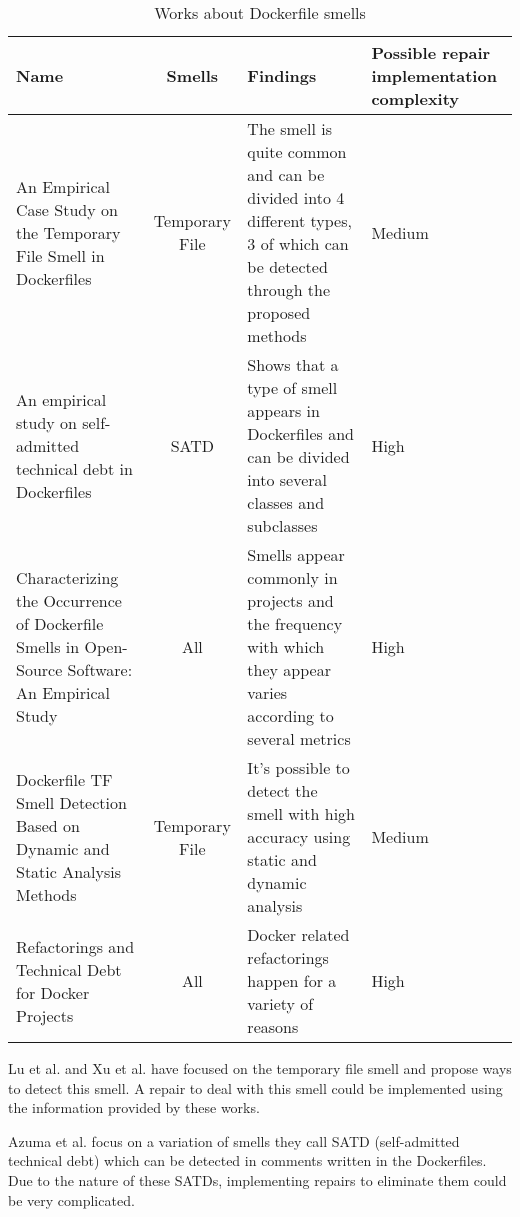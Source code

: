 \begin{table}[H]
    \centering
    \begin{tabular}{|p{}|c|p{}|p{}|}
        \hline \textbf{Name} & \textbf{Smells} & \textbf{Findings} & \textbf{Possible repair implementation complexity} \\
        \hline An Empirical Case Study on the Temporary File Smell in Dockerfiles \cite{luEmpiricalCaseStudy2019} & Temporary File & The smell is quite common and can be divided into 4 different types, 3 of which can be detected through the proposed methods & Medium \\
        \hline An empirical study on self-admitted technical debt in Dockerfiles \cite{azumaEmpiricalStudySelfadmitted2022} & SATD & Shows that a type of smell appears in Dockerfiles and can be divided into several classes and subclasses & High \\
        \hline Characterizing the Occurrence of Dockerfile Smells in Open-Source Software: An Empirical Study \cite{wuCharacterizingOccurrenceDockerfile2020} & All & Smells appear commonly in projects and the frequency with which they appear varies according to several metrics & High \\
        \hline Dockerfile TF Smell Detection Based on Dynamic and Static Analysis Methods \cite{xuDockerfileTFSmell2019} & Temporary File & It's possible to detect the smell with high accuracy using static and dynamic analysis & Medium \\
        \hline Refactorings and Technical Debt for Docker Projects \cite{ksontiniRefactoringsTechnicalDebt} & All & Docker related refactorings happen for a variety of reasons & High \\
        \hline
    \end{tabular} 
    \caption{Works about Dockerfile smells}
    \label{tab:works_dockerfile_smells}
\end{table}

Lu et al. \cite{luEmpiricalCaseStudy2019} and Xu et al. \cite{xuDockerfileTFSmell2019} have focused on the temporary file smell and propose ways to detect this smell. A repair to deal with this smell could be implemented using the information provided by these works.

Azuma et al. \cite{azumaEmpiricalStudySelfadmitted2022} focus on a variation of smells they call SATD (self-admitted technical debt) which can be detected in comments written in the Dockerfiles. Due to the nature of these SATDs, implementing repairs to eliminate them could be very complicated.

